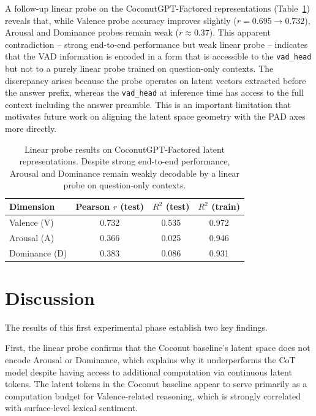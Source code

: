 A follow-up linear probe on the CoconutGPT-Factored representations (Table~\ref{tab:probe_factored}) reveals that, while Valence probe accuracy improves slightly ($r = 0.695 \to 0.732$), Arousal and Dominance probes remain weak ($r \approx 0.37$).
This apparent contradiction -- strong end-to-end performance but weak linear probe -- indicates that the VAD information is encoded in a form that is accessible to the \texttt{vad\_head} but not to a purely linear probe trained on question-only contexts.
The discrepancy arises because the probe operates on latent vectors extracted before the answer prefix, whereas the \texttt{vad\_head} at inference time has access to the full context including the answer preamble.
This is an important limitation that motivates future work on aligning the latent space geometry with the PAD axes more directly.

\begin{table}[H]
\centering
\begin{tabular}{lccc}
\toprule
\textbf{Dimension} & \textbf{Pearson $r$ (test)} & \textbf{$R^2$ (test)} & \textbf{$R^2$ (train)} \\
\midrule
Valence (V)   & 0.732 & 0.535 & 0.972 \\
Arousal (A)   & 0.366 & 0.025 & 0.946 \\
Dominance (D) & 0.383 & 0.086 & 0.931 \\
\bottomrule
\end{tabular}
\caption{Linear probe results on CoconutGPT-Factored latent representations. Despite strong end-to-end performance, Arousal and Dominance remain weakly decodable by a linear probe on question-only contexts.}
\label{tab:probe_factored}
\end{table}

\section{Discussion}

The results of this first experimental phase establish two key findings.

First, the linear probe confirms that the Coconut baseline's latent space does not encode Arousal or Dominance, which explains why it underperforms the CoT model despite having access to additional computation via continuous latent tokens.
The latent tokens in the Coconut baseline appear to serve primarily as a computation budget for Valence-related reasoning, which is strongly correlated with surface-level lexical sentiment.

